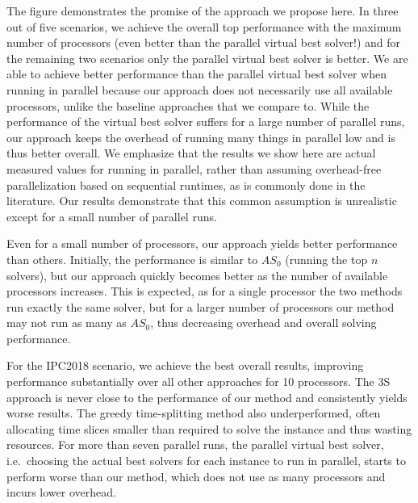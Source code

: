 The figure demonstrates the promise of the approach we propose here. In three out of five scenarios, we achieve the overall top performance with the maximum number of processors (even better than the parallel virtual best solver!) and for the remaining two scenarios only the parallel virtual best solver is better. We are able to achieve better performance than the parallel virtual best solver when running in parallel because our approach does not necessarily use all available processors, unlike the baseline approaches that we compare to. While the performance of the virtual best solver suffers for a large number of parallel runs, our approach keeps the overhead of running many things in parallel low and is thus better overall. We emphasize that the results we show here are actual measured values for running in parallel, rather than assuming overhead-free parallelization based on sequential runtimes, as is commonly done in the literature. Our results demonstrate that this common assumption is unrealistic except for a small number of parallel runs.

Even for a small number of processors, our approach yields better performance than others. Initially, the performance is similar to $AS_0$ (running the top $n$ solvers), but our approach quickly becomes better as the number of available processors increases. This is expected, as for a single processor the two methods run exactly the same solver, but for a larger number of processors our method may not run as many as $AS_0$, thus decreasing overhead and overall solving performance.

For the IPC2018 scenario, we achieve the best overall results, improving performance substantially over all other approaches for 10 processors. The 3S approach is never close to the performance of our method and consistently yields worse results. The greedy time-splitting method also underperformed, often allocating time slices smaller than required to solve the instance and thus wasting resources. For more than seven parallel runs, the parallel virtual best solver, i.e.\ choosing the actual best solvers for each instance to run in parallel, starts to perform worse than our method, which does not use as many processors and incurs lower overhead.

